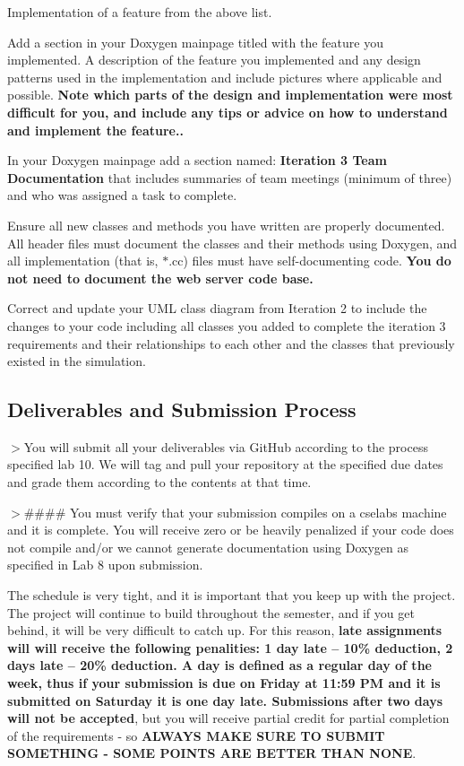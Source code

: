 \begin{DoxyEnumerate}
\item Implementation of a feature from the above list.
\item Add a section in your Doxygen mainpage titled with the feature you implemented. A description of the feature you implemented and any design patterns used in the implementation and include pictures where applicable and possible. {\bfseries Note which parts of the design and implementation were most difficult for you, and include any tips or advice on how to understand and implement the feature..}
\item In your Doxygen mainpage add a section named\+: {\bfseries Iteration 3 Team Documentation} that includes summaries of team meetings (minimum of three) and who was assigned a task to complete.
\item Ensure all new classes and methods you have written are properly documented. All header files must document the classes and their methods using Doxygen, and all implementation (that is, $\ast$.cc) files must have self-\/documenting code. {\bfseries You do not need to document the web server code base.}
\item Correct and update your U\+ML class diagram from Iteration 2 to include the changes to your code including all classes you added to complete the iteration 3 requirements and their relationships to each other and the classes that previously existed in the simulation.
\end{DoxyEnumerate}

\subsection*{Deliverables and Submission Process}

$>$You will submit all your deliverables via Git\+Hub according to the process specified lab 10. We will tag and pull your repository at the specified due dates and grade them according to the contents at that time.

$>$\#\#\#\# You must verify that your submission compiles on a cselabs machine and it is complete. You will receive zero or be heavily penalized if your code does not compile and/or we cannot generate documentation using Doxygen as specified in Lab 8 upon submission.

The schedule is very tight, and it is important that you keep up with the project. The project will continue to build throughout the semester, and if you get behind, it will be very difficult to catch up. For this reason, {\bfseries late assignments will will receive the following penalities\+: 1 day late -- 10\% deduction, 2 days late -- 20\% deduction. A day is defined as a regular day of the week, thus if your submission is due on Friday at 11\+:59 PM and it is submitted on Saturday it is one day late. Submissions after two days will not be accepted}, but you will receive partial credit for partial completion of the requirements -\/ so {\bfseries A\+L\+W\+A\+YS M\+A\+KE S\+U\+RE TO S\+U\+B\+M\+IT S\+O\+M\+E\+T\+H\+I\+NG -\/ S\+O\+ME P\+O\+I\+N\+TS A\+RE B\+E\+T\+T\+ER T\+H\+AN N\+O\+NE}.

